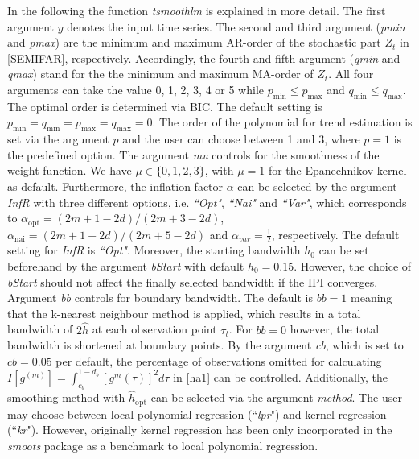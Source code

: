 \documentclass[12pt]{article}
\begin{document}
In the following the function \textit{tsmoothlm} is explained in more detail. The first argument $y$ denotes the input time series. The second and third argument (\textit{pmin} and \textit{pmax}) are the minimum and maximum AR-order of the stochastic part $Z_t$ in \eqref{SEMIFAR}, respectively. Accordingly, the fourth and fifth argument (\textit{qmin} and \textit{qmax}) stand for the the minimum and maximum MA-order of $Z_t$. All four arguments can take the value 0, 1, 2, 3, 4 or 5 while $p_{\text{min}} \leq  p_{\text{max}}$ and $q_{\text{min}} \leq  q_{\text{max}}$. The optimal order is determined via BIC. The default setting is $p_{\text{min}} = q_{\text{min}} = p_{\text{max}} = q_{\text{max}} = 0$. The order of the polynomial for trend estimation is set via the argument $p$ and the user can choose between 1 and 3, where $p = 1$ is the predefined option. The argument \textit{mu} controls for the smoothness of the weight function. We have $\mu \in \{0,1,2,3\}$, with $\mu = 1$ for the Epanechnikov kernel as default. Furthermore, the inflation factor $\alpha$ can be selected by the argument \textit{InfR} with three different options, i.e. \textit{``Opt"}, \textit{``Nai"} and \textit{``Var"}, which corresponds to $\alpha_{\text{opt}} = (2m + 1 - 2d) / (2m + 3 - 2d)$, $\alpha_{\text{nai}} = (2m + 1 - 2d) / (2m + 5 - 2d)$ and $\alpha_{var} = \frac{1}{2}$, respectively. The default setting for \textit{InfR} is \textit{``Opt"}.
Moreover, the starting bandwidth $h_0$ can be set beforehand by the argument \textit{bStart} with default $h_0 = 0.15$. However, the choice of \textit{bStart} should not affect the finally selected bandwidth if the IPI converges. Argument \textit{bb} controls for boundary bandwidth. The default is $bb = 1$ meaning that the k-nearest neighbour method is applied, which results in a total bandwidth of $2\hat{h}$ at each observation point $\tau_t$. For $\textit{bb} = 0$ however, the total bandwidth is shortened at boundary points. By the argument \textit{cb}, which is set to $\textit{cb} = 0.05$ per default, the percentage of observations omitted for calculating $I[g^{(m)}] = \int_{c_b}^{1-d_b}[g^{m}(\tau)]^2d\tau$ in \eqref{ha1} can be controlled. Additionally, the smoothing method with $\hat{h}_{\text{opt}}$ can be selected via the argument \textit{method}. The user may choose between local polynomial regression (``\textit{lpr}") and kernel regression (``\textit{kr}"). However, originally kernel regression has been only incorporated in the \textit{smoots} package as a benchmark to local polynomial regression.
\end{document}
